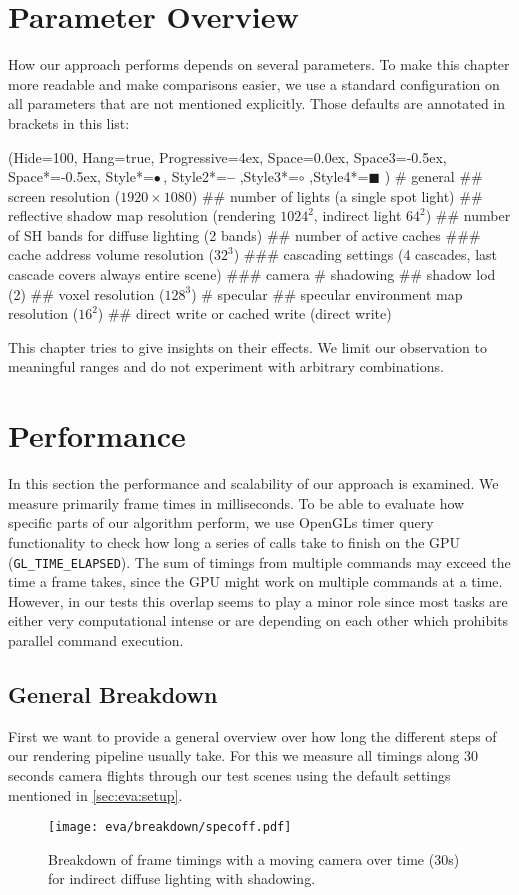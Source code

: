 \documentclass[thesis.tex]{subfiles}
\begin{document}
\section{Parameter Overview}
How our approach performs depends on several parameters.
To make this chapter more readable and make comparisons easier, we use a standard configuration on all parameters that are not mentioned explicitly.
Those defaults are annotated in brackets in this list:
\begin{easylist}
\ListProperties(Hide=100, Hang=true, Progressive=4ex, Space=0.0ex, Space3=-0.5ex, Space*=-0.5ex, Style*=$\bullet\,$,
Style2*=\textbf{--} ,Style3*=$\circ$ ,Style4*=\tiny$\blacksquare$ )
# general
## screen resolution ($1920\times1080$)
## number of lights (a single spot light)
## reflective shadow map resolution (rendering $1024^2$, indirect light $64^2$)
## number of SH bands for diffuse lighting (2 bands)
## number of active caches
### cache address volume resolution ($32^3$)
### cascading settings (4 cascades, last cascade covers always entire scene)
### camera
# shadowing
## shadow lod (2)
## voxel resolution ($128^3$)
# specular
## specular environment map resolution ($16^2$)
## direct write or cached write (direct write)
\end{easylist}
This chapter tries to give insights on their effects.
We limit our observation to meaningful ranges and do not experiment with arbitrary combinations.


\section{Performance}
In this section the performance and scalability of our approach is examined.
We measure primarily frame times in milliseconds.
To be able to evaluate how specific parts of our algorithm perform, we use OpenGLs timer query functionality to check how long a series of calls take to finish on the GPU (\texttt{GL\_TIME\_ELAPSED}).
The sum of timings from multiple commands may exceed the time a frame takes, since the GPU might work on multiple commands at a time.
However, in our tests this overlap seems to play a minor role since most tasks are either very computational intense or are depending on each other which prohibits parallel command execution.

\subsection{General Breakdown}
First we want to provide a general overview over how long the different steps of our rendering pipeline usually take.
For this we measure all timings along 30 seconds camera flights through our test scenes using the default settings mentioned in \autoref{sec:eva:setup}.
\begin{figure}
\centering
\texttt{[image: eva/breakdown/specoff.pdf]}
\caption{Breakdown of frame timings with a moving camera over time (30s) for indirect diffuse lighting with shadowing.}
\label{fig:frameratebreakdown:specoff}
\end{figure}
\end{document}
